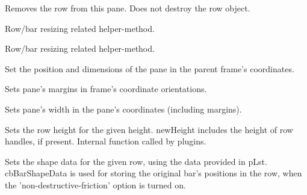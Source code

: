 
Removes the row from this pane. Does not destroy the row object.


\label{cbdockpaneresizebar}


Row/bar resizing related helper-method.


\label{cbdockpaneresizerow}


Row/bar resizing related helper-method.


\label{cbdockpanesetboundsinparent}


Set the position and dimensions of the pane in the parent frame's coordinates.


\label{cbdockpanesetmargins}


Sets pane's margins in frame's coordinate orientations.


\label{cbdockpanesetpanewidth}


Sets pane's width in the pane's coordinates (including margins).


\label{cbdockpanesetrowheight}


Sets the row height for the given height. newHeight includes the height of row handles, if present.
Internal function called by plugins.


\label{cbdockpanesetrowshapedata}


Sets the shape data for the given row, using the data provided in pLst.
cbBarShapeData is used for storing the original bar's positions in the row,
when the 'non-destructive-friction' option is turned on.


